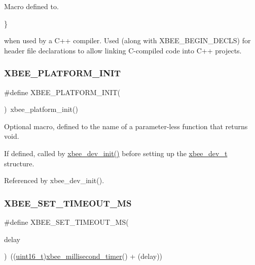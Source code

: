 Macro defined to. 


\begin{DoxyCode}
\} 
\end{DoxyCode}
 when used by a C++ compiler. Used (along with X\+B\+E\+E\+\_\+\+B\+E\+G\+I\+N\+\_\+\+D\+E\+C\+LS) for header file declarations to allow linking C-\/compiled code into C++ projects. \mbox{\label{group__hal_gae29ba672a9f69330a8e16a73a1a11053}} 
\subsubsection{\texorpdfstring{X\+B\+E\+E\+\_\+\+P\+L\+A\+T\+F\+O\+R\+M\+\_\+\+I\+N\+IT}{XBEE\_PLATFORM\_INIT}}
{\footnotesize\ttfamily \#define X\+B\+E\+E\+\_\+\+P\+L\+A\+T\+F\+O\+R\+M\+\_\+\+I\+N\+IT(\begin{DoxyParamCaption}{ }\end{DoxyParamCaption})~xbee\+\_\+platform\+\_\+init()}



Optional macro, defined to the name of a parameter-\/less function that returns void. 

If defined, called by \hyperlink{group__xbee__device_ga550d7c865e75d3fc1df0e64cb880cf3d}{xbee\+\_\+dev\+\_\+init()} before setting up the \hyperlink{structxbee__dev__t}{xbee\+\_\+dev\+\_\+t} structure. 

Referenced by xbee\+\_\+dev\+\_\+init().

\mbox{\label{group__hal_ga848a9903fa7859d84cb22aeddde4c42f}} 
\subsubsection{\texorpdfstring{X\+B\+E\+E\+\_\+\+S\+E\+T\+\_\+\+T\+I\+M\+E\+O\+U\+T\+\_\+\+MS}{XBEE\_SET\_TIMEOUT\_MS}}
{\footnotesize\ttfamily \#define X\+B\+E\+E\+\_\+\+S\+E\+T\+\_\+\+T\+I\+M\+E\+O\+U\+T\+\_\+\+MS(\begin{DoxyParamCaption}\item[{}]{delay }\end{DoxyParamCaption})~((\hyperlink{group__hal__dos_ga5a8b2dc9e45a9ee81a94ef304fb62505}{uint16\+\_\+t})\hyperlink{group__hal_ga22b4e3df788254ca5f8530e9aee58515}{xbee\+\_\+millisecond\+\_\+timer}() + (delay))}



